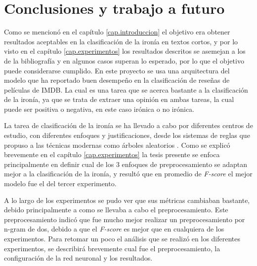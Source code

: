 
\chapter{Conclusiones y trabajo a futuro}\label{cap.conclusiones}

\par Como se mencionó en el capítulo \ref{cap.introduccion} el objetivo era obtener resultados aceptables en la clasificación de la ironía en textos cortos, y por lo visto en el capítulo \ref{cap.experimentos} los resultados descritos se asemejan a los de la bibliografía y en algunos casos superan lo esperado, por lo que el objetivo puede considerarse cumplido. En este proyecto se usa una arquitectura del modelo que ha reportado buen desempeño en la clasificación de reseñas de películas de IMDB. La cual es una tarea que se acerca bastante a la clasificación de la ironía, ya que se trata de extraer una opinión en ambas tareas, la cual puede ser positiva o negativa, en este caso irónica o no irónica.

\begin{table}[H]
	\centering
	
	\label{tab:total2}
\end{table}


\par La tarea de clasificación  de la ironía se ha llevado a cabo por diferentes centros de estudio, con diferentes enfoques y justificaciones, desde los sistemas de reglas que propuso \textcite{utsumi1996unified} a las técnicas modernas como árboles aleatorios \textcite{lopez2016character}. Como se explicó brevemente en el capítulo \ref{cap.experimentos} la tesis presente se enfoca principalmente en definir cual de los 3 enfoques de preprocesamiento se adaptan mejor a la clasificación de la ironía, y resultó que en promedio de \textit{F-score} el mejor modelo fue el del tercer experimento. %

\par A lo largo de los experimentos se pudo ver que sus métricas cambiaban bastante, debido principalmente a como se llevaba a cabo el preprocesamiento. Este preprocesamiento indicó que fue mucho mejor realizar un preprocesamiento por n-gram de dos, debido a que el \textit{F-score} es mejor que en cualquiera de los experimentos. Para retomar un poco el análisis que se realizó en los diferentes experimentos, se describirá brevemente cual fue el preprocesamiento, la configuración de la red neuronal y los resultados.

